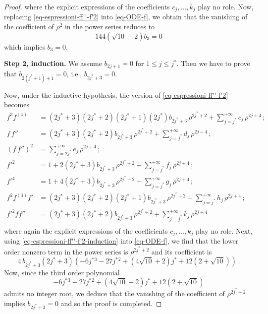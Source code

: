\documentclass[11pt]{amsart}
\theoremstyle{plain}
\theoremstyle{definition}
\numberwithin{equation}{section}
\numberwithin{equation}{section}
\begin{document}
\begin{proof}
where the explicit expressions of the coefficients $c_j,\dots, k_j$ play no role.
Now, replacing \eqref{eq-espressioni-ff''-f'2} into \eqref{eq-ODE-f}, we obtain that the vanishing of the coefficient of $\rho^2$ in the power series reduces to
\[
144 \left(\sqrt{10}+2\right) b_3=0
\]
which implies $b_3=0$.

\textbf{Step 2, induction.} We assume $b_{2j+1}=0$ for $1 \leq j \leq j^*$. Then we have to prove that $b_{2(j^*+1)+1}=0$, i.e., $b_{2j^*+3}=0$.

Now, under the inductive hypothesis, the version of \eqref{eq-espressioni-ff''-f'2} becomes
\begin{equation}\label{eq-espressioni-ff''-f'2-induction}
\begin{split}
f^3 f^{(4)}&=(2j^*+3)(2j^*+2)(2 j^*+1)(2 j^*)b_{2j^*+3}\, \rho^{2j^*+2}+\sum_{j=j^*}^{+\infty} c_j\,\rho^{2j+4}\, ;\\
f\,f''&=(2j^*+3)(2j^*+2)b_{2j^*+3}\, \rho^{2j^*+2}+\sum_{j=j^*}^{+\infty} d_j\,\rho^{2j+4}\, ;\\
(f\,f'')^2&=\sum_{j=2j^*}^{+\infty} e_j\,\rho^{2j+4}\, ;\\
f'^2&=1+2(2j^*+3)b_{2j^*+3}\, \rho^{2j^*+2} +\sum_{j=j^*}^{+\infty} f_j\,\rho^{2j+4}\,;\\
f'^4&=1+4(2j^*+3)b_{2j^*+3}\, \rho^{2j^*+2}+\sum_{j=j^*}^{+\infty} g_j\,\rho^{2j+4}\,;\\
f^2 f^{(3)}f'&=(2j^*+3)(2j^*+2)(2 j^*+1)b_{2j^*+3}\, \rho^{2j^*+2}+\sum_{j=j^*}^{+\infty} h_j\,\rho^{2j+4}\, ;\\
f'^2 f f''&=(2j^*+3)(2j^*+2)b_{2j^*+3}\, \rho^{2j^*+2}+\sum_{j=j^*}^{+\infty} k_j\,\rho^{2j+4}\\
\end{split}
\end{equation}
where again the explicit expressions of the coefficients $c_j,\dots, k_j$ play no role.
Next, using \eqref{eq-espressioni-ff''-f'2-induction} into \eqref{eq-ODE-f}, we find that the lower order nonzero term in the power series is $\rho^{2j^*+2}$ and its coefficient is
\[
4 \, b_{2j^*+3} (2 j^*+3) \left(-6 j^*{^3}-27 j^*{^2}+\left(4 \sqrt{10}+2\right) j^*+12(2+\sqrt{10})\right)\,.
\]
Now, since the third order polynomial 
\[
-6 j^*{^3}-27 j^*{^2}+\left(4 \sqrt{10}+2\right) j^*+12(2+\sqrt{10})
\]
admits no integer root, we deduce that the vanishing of the coefficient of $\rho^{2j^*+2}$ implies $b_{2j^*+3}=0$ and so the proof is completed.
\end{proof}
\end{document}
